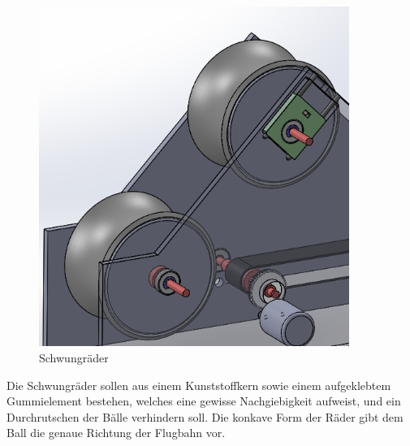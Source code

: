 \begin{figure}[h!]
	\centering
	\includegraphics[width=0.9\textwidth]{Enddokumentation/Loesungskonzept/Bilder/Schwungraeder.png}
	\caption{Schwungräder}
	\label{fig:Schwungräder}	
\end{figure}
Die Schwungräder sollen aus einem Kunststoffkern sowie einem aufgeklebtem Gummielement bestehen, welches eine gewisse Nachgiebigkeit aufweist, und ein Durchrutschen der Bälle verhindern soll.  Die konkave Form der Räder gibt dem Ball die genaue Richtung der Flugbahn vor.
